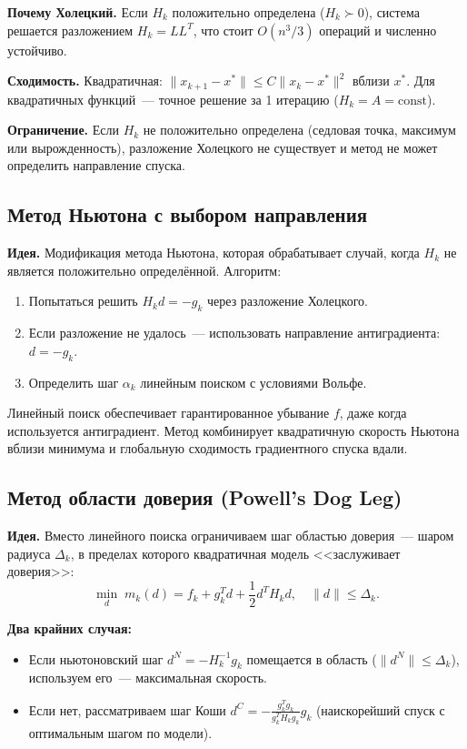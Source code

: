 \documentclass[12pt]{article}
\begin{document}
\textbf{Почему Холецкий.} Если $H_k$ положительно определена ($H_k \succ 0$), система решается разложением $H_k = LL^T$, что стоит $O(n^3/3)$ операций и численно устойчиво.

\textbf{Сходимость.} Квадратичная: $\|x_{k+1} - x^*\| \leq C \|x_k - x^*\|^2$ вблизи $x^*$. Для квадратичных функций~--- точное решение за 1 итерацию ($H_k = A = \text{const}$).

\textbf{Ограничение.} Если $H_k$ не положительно определена (седловая точка, максимум или вырожденность), разложение Холецкого не существует и метод не может определить направление спуска.

\subsection{Метод Ньютона с выбором направления}

\textbf{Идея.} Модификация метода Ньютона, которая обрабатывает случай, когда $H_k$ не является положительно определённой. Алгоритм:
\begin{enumerate}
    \item Попытаться решить $H_k d = -g_k$ через разложение Холецкого.
    \item Если разложение не удалось~--- использовать направление антиградиента: $d = -g_k$.
    \item Определить шаг $\alpha_k$ линейным поиском с условиями Вольфе.
\end{enumerate}

Линейный поиск обеспечивает гарантированное убывание $f$, даже когда используется антиградиент. Метод комбинирует квадратичную скорость Ньютона вблизи минимума и глобальную сходимость градиентного спуска вдали.

\subsection{Метод области доверия (Powell's Dog Leg)}

\textbf{Идея.} Вместо линейного поиска ограничиваем шаг областью доверия~--- шаром радиуса $\Delta_k$, в пределах которого квадратичная модель <<заслуживает доверия>>:
\[
    \min_{d} \; m_k(d) = f_k + g_k^T d + \frac{1}{2} d^T H_k d, \quad \|d\| \leq \Delta_k.
\]

\textbf{Два крайних случая:}
\begin{itemize}
    \item Если ньютоновский шаг $d^N = -H_k^{-1}g_k$ помещается в область ($\|d^N\| \leq \Delta_k$), используем его~--- максимальная скорость.
    \item Если нет, рассматриваем шаг Коши $d^C = -\frac{g_k^T g_k}{g_k^T H_k g_k} g_k$ (наискорейший спуск с оптимальным шагом по модели).
\end{itemize}
\end{document}

